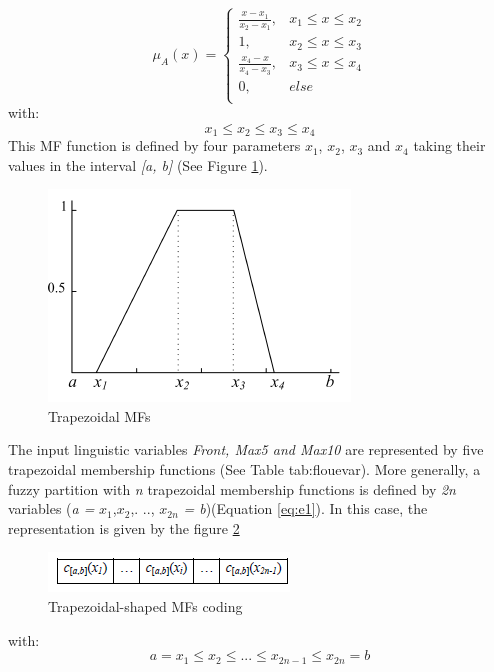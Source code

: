 \documentclass[runningheads,a4paper]{llncs}
\begin{document}
\begin{equation}
\mu_{A}(x)= \left \{
\begin{array}{ll}
\frac{x - x_{1}}{x_{2} - x_{1}},& x_{1} \leq x \leq x_{2}\\
1 , &x_{2} \leq x \leq x_{3}\\
\frac{x_{4} - x}{x_{4} - x_{3}},& x_{3} \leq x \leq x_{4}\\
0        ,& else\\	
\end{array}
\right.
\label{eq:trapmf}
\end{equation}
with:
\begin{equation}
x_{1} \leq x_{2} \leq x_{3} \leq x_{4}
\end{equation}
This MF function is defined by four parameters $x_{1}$, $x_{2}$, $x_{3}$ and $x_{4}$ taking their values in the interval \textit{[a, b]} (See Figure \ref{fig:trapeze}).																			
\begin{figure}[!ht] 
	\begin{center}
		\includegraphics[scale=0.95]{fig/trapese}
		\caption {Trapezoidal MFs}
		\label{fig:trapeze}
	\end{center}
\end{figure}
The input  linguistic variables \textit{Front, Max5 and Max10}  are represented by five trapezoidal membership functions (See Table {tab:flouevar}).
More generally, a fuzzy partition with \textit{n} trapezoidal membership functions is defined by \textit{2n} variables (\textit{a =} $ x_{1}$,$x_{2} $,. .., $x_{2n} $ \textit {= b})(Equation \ref{eq:e1}). In this case, the representation is given by the figure \ref{fig:at}
\begin{figure}[!ht] 
	\begin{center}
		\includegraphics[scale=0.95]{fig/at}
		\caption {Trapezoidal-shaped MFs coding}
		\label{fig:at}
	\end{center}
\end{figure}
with:
\begin{equation}
a = x_{1} \leq x_{2} \leq...\leq x_{2n-1} \leq x_{2n}=b 	
\end{equation}		
\end{document}
